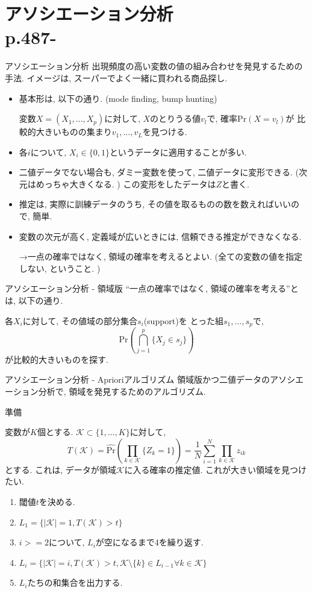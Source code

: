 \documentclass[dvipdfmx,8pt]{beamer}
\begin{document}
  \section{アソシエーション分析\\p.487-}
  \begin{frame}{アソシエーション分析}
    出現頻度の高い変数の値の組み合わせを発見するための手法.
    イメージは, スーパーでよく一緒に買われる商品探し.
    \begin{itemize}
      \item 基本形は, 以下の通り. (mode finding, bump hunting)

      変数$X=(X_1,\dots,X_p)$に対して, $X$のとりうる値$v_l$で, 確率$\mathrm{Pr}(X=v_l)$が
      比較的大きいものの集まり$v_1,\dots,v_L$を見つける.
      \item 各$i$について, $X_i\in\{0,1\}$というデータに適用することが多い.
      \item 二値データでない場合も, ダミー変数を使って, 二値データに変形できる.
      (次元はめっちゃ大きくなる. )
      この変形をしたデータは$Z$と書く.
      \item 推定は, 実際に訓練データのうち, その値を取るものの数を数えればいいので, 簡単.
      \item 変数の次元が高く, 定義域が広いときには, 信頼できる推定ができなくなる.

      →一点の確率ではなく, 領域の確率を考えるとよい. (全ての変数の値を指定しない, ということ. )
    \end{itemize}
  \end{frame}
  \begin{frame}{アソシエーション分析 - 領域版}
    ``一点の確率ではなく, 領域の確率を考える''とは, 以下の通り.

    各$X_i$に対して, その値域の部分集合$s_i$(support)を
    とった組$s_1,\dots,s_p$で,
    \[
      \mathrm{Pr} \left (\bigcap_{j=1}^p\{X_j \in s_j\} \right )
    \]
    が比較的大きいものを探す.
  \end{frame}
  \begin{frame}{アソシエーション分析 - Aprioriアルゴリズム}
    領域版かつ二値データのアソシエーション分析で, 領域を発見するためのアルゴリズム.

    準備

    変数が$K$個とする.
    $\mathcal{K}\subset\{1,\dots,K\}$に対して,
    \[
      T(\mathcal{K})=\hat{\mathrm{Pr}}\left( \prod_{k\in\mathcal{K}}\{Z_k=1\}  \right)=\frac{1}{N}\sum_{i=1}^N\prod_{k\in\mathcal{K}}z_{ik}
    \]
    とする. これは, データが領域$\mathcal{K}$に入る確率の推定値.
    これが大きい領域を見つけたい.

    \begin{enumerate}
      \item 閾値$t$を決める.
      \item $L_1=\{|\mathcal{K}|=1, T(\mathcal{K})>t\}$
      \item $i>=2$について, $L_i$が空になるまで4を繰り返す.
      \item $L_i=\{|\mathcal{K}|=i, T(\mathcal{K})>t, \mathcal{K}\setminus\{k\}\in L_{i-1} \forall k \in \mathcal{K}\}$
      \item $L_i$たちの和集合を出力する.
    \end{enumerate}
  \end{frame}
\end{document}
